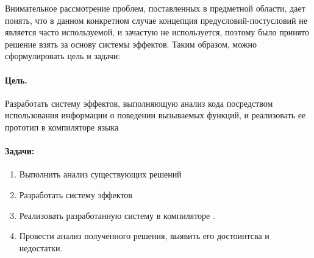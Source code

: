 Внимательное рассмотрение проблем, поставленных в предметной области, дает понять, что в данном конкретном случае концепция предусловий-постусловий не является часто используемой, и зачастую не используется, поэтому было принято решение взять за основу системы эффектов. Таким образом, можно сформулировать цель и задачи:


\paragraph{Цель.} Разработать систему эффектов, выполняющую анализ кода посредством использования информации о поведении вызываемых функций, и реализовать ее прототип в компиляторе языка 

\paragraph{Задачи:}

\begin{enumerate}
	\item Выполнить анализ существующих решений
	
	\item Разработать систему эффектов
	
	\item Реализовать разработанную систему в компиляторе .
	
	\item Провести анализ полученного решения, выявить его достоинтсва и недостатки.
\end{enumerate}